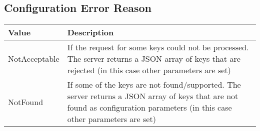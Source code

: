 \subsection{Configuration Error Reason}
\label{types:ConfigErrorReason}

\begin{tabularx}{\linewidth}{ | l | X | }
  \hline
  \rowcolor{table-head}
  Value & Description \\
  \hline
  NotAcceptable 		& If the request for some keys could not be processed. The server returns a JSON array of keys that are rejected (in this case other parameters are set) \\
  NotFound 	& If some of the keys are not found/supported. The server returns a JSON array of keys that are not found as configuration parameters (in this case other parameters are set) \\
  \hline
\end{tabularx}

%
